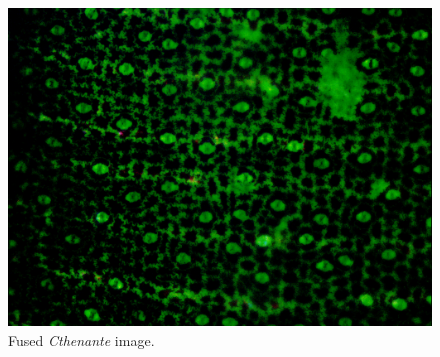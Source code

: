 \begin{figure}[H]
  \centering
  \caption{Fused \textit{Cthenante} image.}
  \label{fig:fused_cthenante}
  \includegraphics[scale=0.3]{images/fused_cthenante.png}
  \centering
  \fautor
\end{figure}